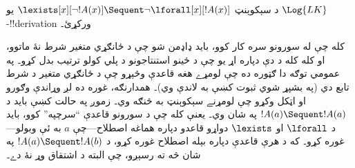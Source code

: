\documentclass[../../../include/open-logic-section]{subfiles}
\begin{document}


\begin{ex}
د سېکوېنټ $\lexists[x][\lnot !A(x)]
\Sequent \lnot \lforall[x][!A(x)]$ يو
$\Log{LK}$-!!{derivation} ورکړئ۔

کله چې له سورونو سره کار کوو، بايد ډاډمن شو چې د ځانګړي متغير شرط
نۀ ماتوو، او کله کله د دې دپاره اړ يو چې د ځينو استنتاجونو د پلي
کولو ترتيب بدل کړو۔ په عمومي توګه دا ګټوره ده چې لومړے هغه قاعدې
وڅېړو چې د ځانګړي متغير د شرط تابع دي (په بشپړ شوي ثبوت کښې به
لاندې وي)۔ همدارنګه، غوره ده لږ وړاندې وګورو او اټکل وکړو چې
لومړنے سېکوېنټ به څنګه وي۔ زموږ په حالت کښې بايد د
$!A(a) \Sequent !A(a)$ په شان وي۔ يعنې کله چې د سورونو قاعدې
“سرچپه” کوو، بايد د $\lforall$ او $\lexists$ دواړو قاعدو دپاره
هماغه اصطلاح---چې $a$ به ئې وبولو---غوره کړو۔ که د هرې قاعدې
دپاره بېله اصطلاح غوره کړو، د $!A(a) \Sequent !A(b)$ په شان څه
ته رسېږو، چې البته د اشتقاق وړ نۀ دے۔


\end{ex}
\end{document}
